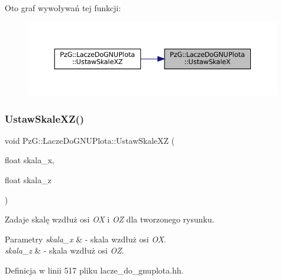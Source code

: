 Oto graf wywoływań tej funkcji\+:\nopagebreak
\begin{figure}[H]
\begin{center}
\leavevmode
\includegraphics[width=350pt]{class_pz_g_1_1_lacze_do_g_n_u_plota_a855b8338bfe3e5d294d719f24b11090e_icgraph}
\end{center}
\end{figure}
\mbox{\label{class_pz_g_1_1_lacze_do_g_n_u_plota_a4308151b54e105d302803146a3238699}} 
\subsubsection{\texorpdfstring{UstawSkaleXZ()}{UstawSkaleXZ()}}
{\footnotesize\ttfamily void Pz\+G\+::\+Lacze\+Do\+G\+N\+U\+Plota\+::\+Ustaw\+Skale\+XZ (\begin{DoxyParamCaption}\item[{float}]{skala\+\_\+x,  }\item[{float}]{skala\+\_\+z }\end{DoxyParamCaption})\hspace{0.3cm}{\ttfamily [inline]}}

Zadaje skalę wzdłuż osi {\itshape OX} i {\itshape OZ} dla tworzonego rysunku. 
\begin{DoxyParams}{Parametry}
{\em skala\+\_\+x} & -\/ skala wzdłuż osi {\itshape OX}. \\
\hline
{\em skala\+\_\+z} & -\/ skala wzdłuż osi {\itshape OZ}. \\
\hline
\end{DoxyParams}


Definicja w linii 517 pliku lacze\+\_\+do\+\_\+gnuplota.\+hh.

